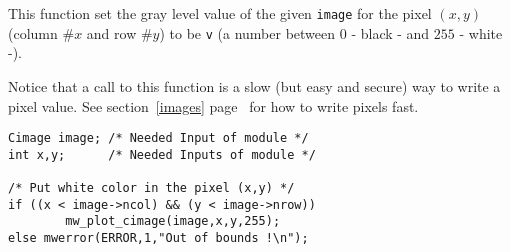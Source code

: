 \newpage %

\Description
This function set the gray level value of the given \verb+image+ for the pixel $(x,y)$ (column $\# x$ and row $\# y$) to be \verb+v+  (a number between $0$ - black - and $255$ - white -).

Notice that a call to this function is a slow (but easy and secure) way to 
write a pixel value.
See section~\ref{images} page~\pageref{images} for how to write pixels fast.

\Next
\Example
\begin{verbatim}
Cimage image; /* Needed Input of module */
int x,y;      /* Needed Inputs of module */

/* Put white color in the pixel (x,y) */
if ((x < image->ncol) && (y < image->nrow))
        mw_plot_cimage(image,x,y,255);
else mwerror(ERROR,1,"Out of bounds !\n");

\end{verbatim}
\newpage %

